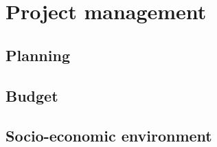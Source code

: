 \chapter{Project management}
\label{ch:project-management}


\section{Planning}

\section{Budget}

\section{Socio-economic environment}
